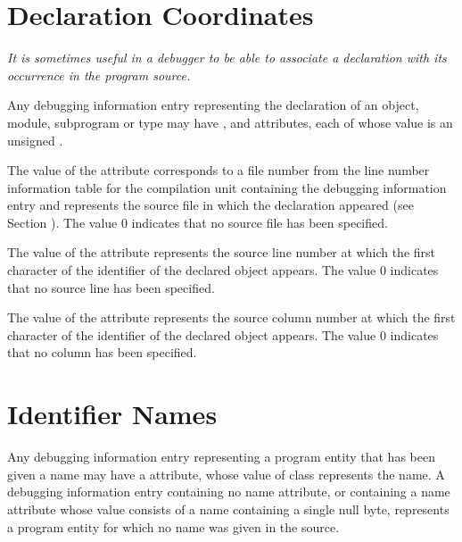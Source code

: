 \section{Declaration Coordinates}
\label{chap:declarationcoordinates}
\textit{It is sometimes useful in a debugger to be able to associate
a declaration with its occurrence in the program source.}

Any debugging information entry representing 
the declaration of an object, module, subprogram or type may have
\DWATdeclfileDEFN,\hypertarget{chap:DWATdeclfilefilecontainingsourcedeclaration}{}
\DWATdecllineDEFN\hypertarget{chap:DWATdecllinelinenumberofsourcedeclaration}{}
 and 
\DWATdeclcolumnDEFN\hypertarget{chap:DWATdeclcolumncolumnpositionofsourcedeclaration}{}
attributes, each of whose value is an unsigned
.

The value of 
the 
\DWATdeclfile{}
attribute 
corresponds to
a file number from the line number information table for the
compilation unit containing the debugging information entry and
represents the source file in which the declaration appeared
(see Section ). 
The value 0 indicates that no source file
has been specified.

The value of 
the \DWATdeclline{} attribute represents
the source line number at which the first character of
the identifier of the declared object appears. The value 0
indicates that no source line has been specified.

The value of 
the \DWATdeclcolumn{} attribute represents
the source column number at which the first character of
the identifier of the declared object appears. The value 0
indicates that no column has been specified.

\section{Identifier Names}
\label{chap:identifiernames}
Any\hypertarget{chap:DWATnamenameofdeclaration}{}
debugging information entry 
representing 
a program entity that has been given a name may have a 
\DWATnameDEFN{} 
attribute, whose value of 
\bb
class 
\eb
\CLASSstring{} represents the name.
\bbeb
A debugging information entry containing
no name attribute, or containing a name attribute whose value
consists of a name containing a single null byte, represents
a program entity for which no name was given in the source.

